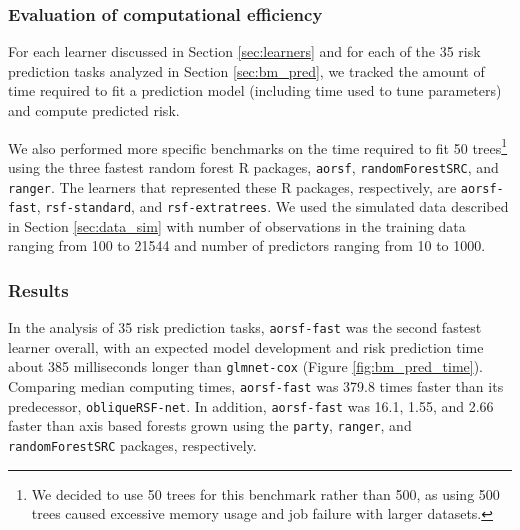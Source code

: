 \documentclass[twoside,11pt]{article}\usepackage[]{graphicx}\usepackage[]{xcolor}
\newcommand{\secref}[1]{Section \ref{#1}}
\begin{document}
\subsubsection{Evaluation of computational efficiency}

For each learner discussed in \secref{sec:learners} and for each of the 35 risk prediction tasks analyzed in \secref{sec:bm_pred}, we tracked the amount of time required to fit a prediction model (including time used to tune parameters) and compute predicted risk.

We also performed more specific benchmarks on the time required to fit 50 trees\footnote{We decided to use 50 trees for this benchmark rather than 500, as using 500 trees caused excessive memory usage and job failure with larger datasets.} using the three fastest random forest R packages, \texttt{aorsf}, \texttt{randomForestSRC}, and \texttt{ranger}. The learners that represented these R packages, respectively, are \texttt{aorsf-fast}, \texttt{rsf-standard}, and \texttt{rsf-extratrees}. We used the simulated data described in \secref{sec:data_sim} with number of observations in the training data ranging from 100 to 21544 and number of predictors ranging from 10 to 1000.

\subsubsection{Results}




In the analysis of 35 risk prediction tasks, \texttt{aorsf-fast} was the second fastest learner overall, with an expected model development and risk prediction time about 385 milliseconds longer than \texttt{glmnet-cox} (Figure \ref{fig:bm_pred_time}). Comparing median computing times, \texttt{aorsf-fast} was 379.8 times faster than its predecessor, \texttt{obliqueRSF-net}. In addition, \texttt{aorsf-fast} was 16.1, 1.55, and 2.66 faster than axis based forests grown using the \texttt{party}, \texttt{ranger}, and \texttt{randomForestSRC} packages, respectively.
\end{document}
